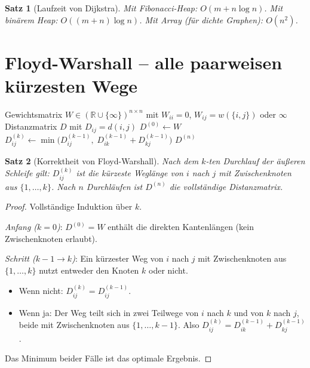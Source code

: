 ﻿\documentclass[a4paper,12pt,openany,oneside]{book}
\theoremstyle{definition}
\theoremstyle{plain}
\newtheorem{satz}{Satz}[chapter]
\theoremstyle{remark}
\begin{document}
\begin{satz}[Laufzeit von Dijkstra]
  Mit Fibonacci-Heap: $O(m + n \log n)$. Mit bin\"arem Heap: $O((m+n)\log n)$.
  Mit Array (f\"ur dichte Graphen): $O(n^2)$.
\end{satz}

\section{Floyd-Warshall -- alle paarweisen k\"urzesten Wege}

\begin{algorithm}[H]
  \caption{Algorithmus von Floyd-Warshall}
  \label{alg:fw}
  \begin{algorithmic}[1]
    \Require Gewichtsmatrix $W \in (\mathbb{R} \cup \{\infty\})^{n \times n}$
             mit $W_{ii}=0$, $W_{ij}=w(\{i,j\})$ oder $\infty$
    \Ensure Distanzmatrix $D$ mit $D_{ij} = d(i,j)$
    \State $D^{(0)} \gets W$
          \State $D^{(k)}_{ij} \gets
                 \min\bigl(D^{(k-1)}_{ij},\;
                           D^{(k-1)}_{ik} + D^{(k-1)}_{kj}\bigr)$
        \EndFor
      \EndFor
    \EndFor
    \State \Return $D^{(n)}$
  \end{algorithmic}
\end{algorithm}

\begin{satz}[Korrektheit von Floyd-Warshall]
  Nach dem $k$-ten Durchlauf der \"au\ss{}eren Schleife gilt:
  $D^{(k)}_{ij}$ ist die k\"urzeste Wegl\"ange von $i$ nach $j$
  mit Zwischenknoten aus $\{1,\ldots,k\}$.
  Nach $n$ Durchl\"aufen ist $D^{(n)}$ die vollst\"andige Distanzmatrix.
\end{satz}

\begin{proof}
  Vollst\"andige Induktion \"uber $k$.

  \emph{Anfang ($k=0$)}: $D^{(0)} = W$ enth\"alt die direkten
  Kantenl\"angen (kein Zwischenknoten erlaubt). \checkmark

  \emph{Schritt ($k-1 \to k$)}: Ein k\"urzester Weg von $i$ nach $j$
  mit Zwischenknoten aus $\{1,\ldots,k\}$ nutzt entweder den Knoten $k$
  oder nicht.
  \begin{itemize}
    \item Wenn nicht: $D^{(k)}_{ij} = D^{(k-1)}_{ij}$.
    \item Wenn ja: Der Weg teilt sich in zwei Teilwege von $i$ nach $k$
          und von $k$ nach $j$, beide mit Zwischenknoten aus
          $\{1,\ldots,k-1\}$. Also
          $D^{(k)}_{ij} = D^{(k-1)}_{ik} + D^{(k-1)}_{kj}$.
  \end{itemize}
  Das Minimum beider F\"alle ist das optimale Ergebnis.
\end{proof}
\end{document}

